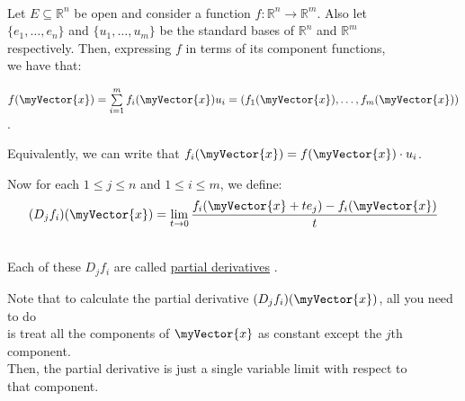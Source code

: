 \documentclass{book}
\newcommand{\teachComment}{
   \color{Orange}%
   \fontsize{12}{14}\selectfont%
}
\newenvironment{myTindent}{%
   \begin{adjustwidth}{7.5em}{0em}%
}{%
   \end{adjustwidth}%
}
\newcommand{\udefine}[1]{{%
   \setulcolor{Red}%
   \setul{0.14em}{0.07em}%
   \ul{#1}%
}}
\newcommand{\mySepTwo}[1][.]{%
   {\noindent\color{#1}{\rule{6.5in}{0.5mm}}}\\%
}
\newcommand{\retTwo}{\hfill\bigbreak}
\newcommand{\mVec}[1]{\myVector{#1}}
\begin{document}
\mySepTwo

Let $E \subseteq \mathbb{R}^n$ be open and consider a function $f: \mathbb{R}^n \longrightarrow \mathbb{R}^m$. Also let\\ $\{e_1, \ldots, e_n\}$ and $\{u_1, \ldots, u_m\}$ be the standard bases of $\mathbb{R}^n$ and $\mathbb{R}^m$\\ respectively. Then, expressing $f$ in terms of its component functions,\\ we have that:

{\centering $f(\mVec{x}) = \sum\limits_{i=1}^mf_{i}(\mVec{x})u_i = (f_1(\mVec{x}), \ldots, f_m(\mVec{x}))$.\retTwo\par}

Equivalently, we can write that $f_i(\mVec{x}) = f(\mVec{x}) \cdot u_i$.\retTwo

Now for each $1 \leq j \leq n$ and $1 \leq i \leq m$, we define:\\ [-26pt]

\[(D_jf_i)(\mVec{x}) = \lim\limits_{t\rightarrow 0}\frac{f_i(\mVec{x} + te_j) - f_i(\mVec{x})}{t}\]

\phantom{.}\\Each of these $D_jf_i$ are called \udefine{partial derivatives}.\retTwo


\begin{myTindent}\teachComment
   Note that to calculate the partial derivative $(D_jf_i)(\mVec{x})$, all you need to do\\ is treat all the components of $\mVec{x}$ as constant except the $j$th component.\\ Then, the partial derivative is just a single variable limit with respect to\\ that component.\retTwo
\end{myTindent}
\end{document}
